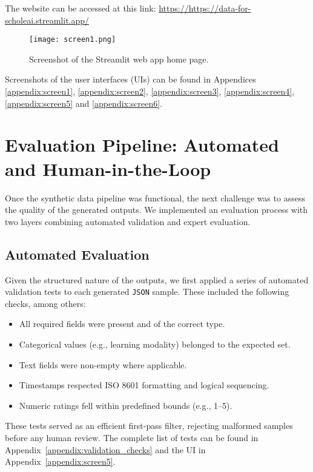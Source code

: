 The website can be accessed at this link: \href{https://https://data-for-scholeai.streamlit.app/}{https://https://data-for-scholeai.streamlit.app/}

\begin{figure*}[h!]
	\center
	\texttt{[image: screen1.png]}
  	\caption{Screenshot of the Streamlit web app home page.}
  	\label{fig:screen1}
\end{figure*}

Screenshots of the user interfaces (UIs) can be found in Appendices \ref{appendix:screen1}, \ref{appendix:screen2}, \ref{appendix:screen3}, \ref{appendix:screen4}, \ref{appendix:screen5} and \ref{appendix:screen6}.

\section{Evaluation Pipeline: Automated and Human-in-the-Loop}

Once the synthetic data pipeline was functional, the next challenge was to assess the quality of the generated outputs. We implemented an evaluation process with two layers combining automated validation and expert evaluation.

\subsection{Automated Evaluation}  
Given the structured nature of the outputs, we first applied a series of automated validation tests to each generated \texttt{JSON} sample. These included the following checks, among others:
\begin{itemize}
    \item All required fields were present and of the correct type.
    \item Categorical values (e.g., learning modality) belonged to the expected set.
    \item Text fields were non-empty where applicable.
    \item Timestamps respected ISO 8601 formatting and logical sequencing.
    \item Numeric ratings fell within predefined bounds (e.g., 1--5).
\end{itemize}

These tests served as an efficient first-pass filter, rejecting malformed samples before any human review. The complete list of tests can be found in Appendix~\ref{appendix:validation_checks} and the UI in Appendix~\ref{appendix:screen5}.

